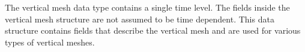 The vertical mesh data type contains a single time level. The fields inside the
vertical mesh structure are not assumed to be time dependent. This data
structure contains fields that describe the vertical mesh and are used for
various types of vertical meshes.
